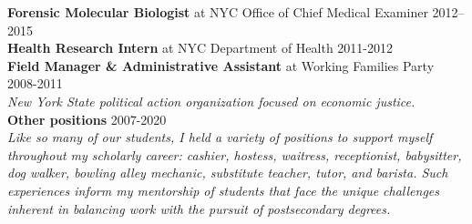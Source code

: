 \documentclass[]{article}
\begin{document}
\vspace{1.5mm}

\textbf{Forensic Molecular Biologist} at NYC Office of Chief Medical Examiner \hfill 2012--2015\\
   
\textbf{Health Research Intern} at NYC Department of Health \hfill 2011-2012\\
     
\textbf{Field Manager \& Administrative Assistant} at Working Families Party \hfill 2008-2011\\
\textit{New York State political action organization focused on economic justice.}\\

\textbf{Other positions} \hfill 2007-2020\\
\textit{Like so many of our students, I held a variety of positions to support myself throughout my scholarly career: cashier, hostess, waitress, receptionist, babysitter, dog walker, bowling alley mechanic, substitute teacher, tutor, and barista. Such experiences inform my mentorship of students that face the unique challenges inherent in balancing work with the pursuit of postsecondary degrees.}

\vspace{3mm}
\end{document}
